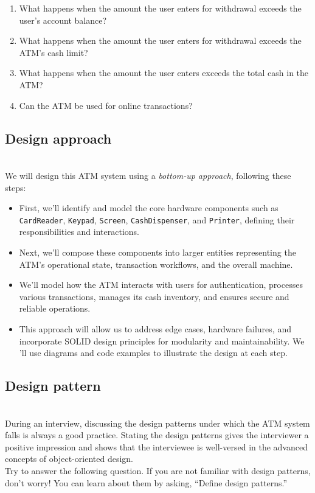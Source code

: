 \begin{enumerate}
\item
What happens when the amount the user enters for withdrawal exceeds the user's account balance?
\item
What happens when the amount the user enters for withdrawal exceeds the ATM's cash limit?
\item
What happens when the amount the user enters exceeds the total cash in the ATM?
\item
Can the ATM be used for online transactions?
\end{enumerate}

\subsection{Design approach}\label{D06nks8FfR2O_xpSVW1A-}
\\
We will design this ATM system using a \emph{bottom-up approach}, following these steps:

\begin{itemize}
\item
\protect{}\label{_KOjJNDy660ZuE758FoJU}
First, we'll identify and model the core hardware components such as \texttt{CardReader}, \texttt{Keypad}, \texttt{Screen}, \texttt{CashDispenser}, and \texttt{Printer}, defining their responsibilities and interactions.
\item
\protect{}\label{S4ORq9QdSR3fOI60iqNnB}
Next, we'll compose these components into larger entities representing the ATM's operational state, transaction workflows, and the overall machine.
\item
\protect{}\label{qkPa1nXbkB0ji4KowjrqB}
We'll model how the ATM interacts with users for authentication, processes various transactions, manages its cash inventory, and ensures secure and reliable operations.
\item
\protect{}\label{ZTwp7jGf1t3gl0BIQI2Fd}
This approach will allow us to address edge cases, hardware failures, and incorporate SOLID design principles for modularity and maintainability. We 'll use diagrams and code examples to illustrate the design at each step.
\end{itemize}

\subsection{Design pattern~}\label{Tl3CBEntZg8Htk50fc3i7}
\\
During an interview, discussing the design patterns under which the ATM system falls is always a good practice. Stating the design patterns gives the interviewer a positive impression and shows that the interviewee is well-versed in the advanced concepts of object-oriented design.
\\
Try to answer the following question. If you are not familiar with design patterns, don't worry! You can learn about them by asking, ``Define design patterns.''

